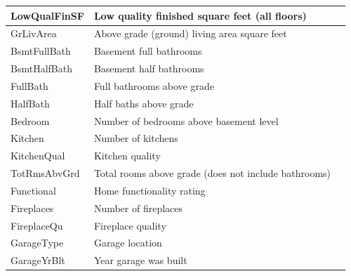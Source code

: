 \begin{longtable}{|l|p{3cm}|p{4cm}|}
    \hline
    LowQualFinSF     & Low quality finished square feet (all floors)                                                    \\
    \hline
    GrLivArea        & Above grade (ground) living area square feet                                                     \\
    \hline
    BsmtFullBath     & Basement full bathrooms                                                                          \\
    \hline
    BsmtHalfBath     & Basement half bathrooms                                                                          \\
    \hline
    FullBath         & Full bathrooms above grade                                                                       \\
    \hline
    HalfBath         & Half baths above grade                                                                           \\
    \hline
    Bedroom          & Number of bedrooms above basement level                                                          \\
    \hline
    Kitchen          & Number of kitchens                                                                               \\
    \hline
    KitchenQual      & Kitchen quality                                                                                  \\
    \hline
    TotRmsAbvGrd     & Total rooms above grade (does not include bathrooms)                                             \\
    \hline
    Functional       & Home functionality rating                                                                        \\
    \hline
    Fireplaces       & Number of fireplaces                                                                             \\
    \hline
    FireplaceQu      & Fireplace quality                                                                                \\
    \hline
    GarageType       & Garage location                                                                                  \\
    \hline
    GarageYrBlt      & Year garage was built                                                                            \\

\end{longtable}
